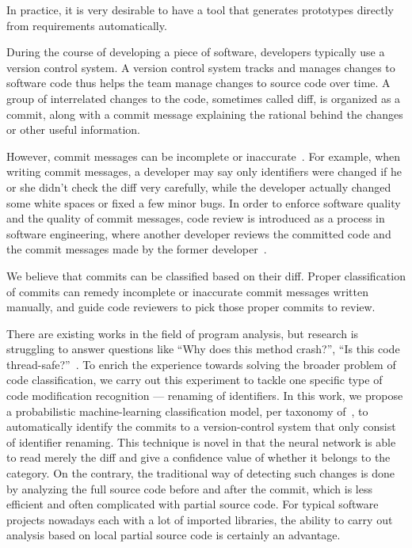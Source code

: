 In practice, it is very desirable to have a tool that generates prototypes directly from requirements automatically. 



During the course of developing a piece of software, developers typically use a version control system. 
A version control system tracks and manages changes to software code thus helps the team manage changes to source code over time.
A group of interrelated changes to the code, sometimes called diff, is organized as a commit, along with a commit message explaining the rational behind the changes or other useful information.

However, commit messages can be incomplete or inaccurate~\cite{buse2010automatically}.
For example, when writing commit messages,
a developer may say only identifiers were changed
if he or she didn't check the diff very carefully,
while the developer actually changed some white spaces or fixed a few minor bugs.
In order to enforce software quality and the quality of commit messages,
code review is introduced as a process in software engineering,
where another developer reviews the committed code and
the commit messages made by the former developer~\cite{shimagaki2016study}. 

We believe that commits can be classified based on their diff.
Proper classification of commits can remedy incomplete or inaccurate commit messages written manually, and
guide code reviewers to pick those proper commits to review.

There are existing works in the field of program analysis,
but research is struggling to answer questions like ``Why does this method crash?'', ``Is this code thread-safe?''~\cite{alexandru2017replicating}.
To enrich the experience towards solving the broader problem of code classification,
we carry out this experiment to tackle one specific type of code modification recognition 
--- renaming of identifiers.
In this work, we propose a probabilistic machine-learning classification model,
per taxonomy of~\cite{allamanis2018survey},
to automatically identify the commits to a version-control system that only consist of identifier renaming. 
This technique is novel in that the neural network is able to read merely the diff and give a confidence value of whether it belongs to the category.
On the contrary, the traditional way of detecting such changes is done by analyzing the full source code before and after the commit,
which is less efficient and often complicated with partial source code.
For typical software projects nowadays each with a lot of imported libraries,
the ability to carry out analysis based on local partial source code is certainly an advantage.

